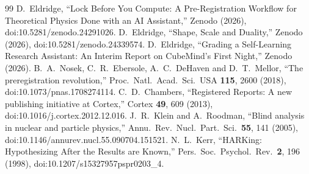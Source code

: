 \documentclass[aps,prd,twocolumn,superscriptaddress,nofootinbib,showkeys]{revtex4-2}
\begin{document}
\begin{thebibliography}{99}
 D.~Eldridge, ``Lock Before You Compute: A Pre-Registration Workflow for Theoretical Physics Done with an AI Assistant,'' Zenodo (2026), doi:10.5281/zenodo.24291026.
 D.~Eldridge, ``Shape, Scale and Duality,'' Zenodo (2026), doi:10.5281/zenodo.24339574.
 D.~Eldridge, ``Grading a Self-Learning Research Assistant: An Interim Report on CubeMind's First Night,'' Zenodo (2026).
 B.~A.~Nosek, C.~R.~Ebersole, A.~C.~DeHaven and D.~T.~Mellor, ``The preregistration revolution,'' Proc.\ Natl.\ Acad.\ Sci.\ USA \textbf{115}, 2600 (2018), doi:10.1073/pnas.1708274114.
 C.~D.~Chambers, ``Registered Reports: A new publishing initiative at Cortex,'' Cortex \textbf{49}, 609 (2013), doi:10.1016/j.cortex.2012.12.016.
 J.~R.~Klein and A.~Roodman, ``Blind analysis in nuclear and particle physics,'' Annu.\ Rev.\ Nucl.\ Part.\ Sci.\ \textbf{55}, 141 (2005), doi:10.1146/annurev.nucl.55.090704.151521.
 N.~L.~Kerr, ``HARKing: Hypothesizing After the Results are Known,'' Pers.\ Soc.\ Psychol.\ Rev.\ \textbf{2}, 196 (1998), doi:10.1207/s15327957pspr0203\_4.
\end{thebibliography}
\end{document}
